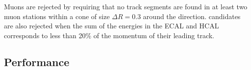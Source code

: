 Muons are rejected by requiring that no track segments are found in at least two muon stations within a cone of size $\Delta R = 0.3$ around the \tauh direction. \tauh candidates are also rejected when the sum of the energies in the ECAL and HCAL corresponds to less than 20\% of the momentum of their leading track.

\subsection{Performance}


